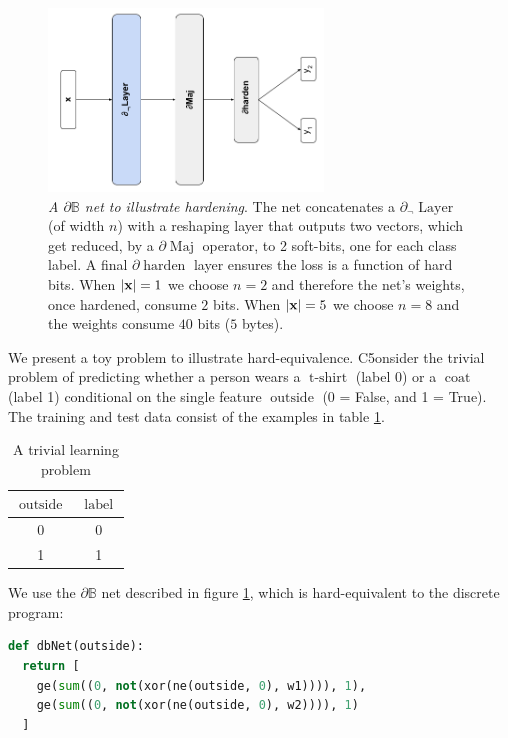 \documentclass{article} %
\begin{document}
\begin{figure}[t!]
	\centering
	\includegraphics[width=0.65\textwidth]{toy-example-architecture.png}
	\caption{{\em A $\partial\mathbb{B}$ net to illustrate hardening}. The net concatenates a $\partial_{\neg}\!\operatorname{Layer}$ (of width $n$) with a reshaping layer that  outputs two vectors, which get reduced, by a $\partial\!\operatorname{Maj}$ operator,  to 2 soft-bits, one for each class label. A final $\partial\!\operatorname{harden}$ layer ensures the loss is a function of hard bits. When $|{\bf x}|=1$ we choose $n=2$ and therefore the net's weights, once hardened, consume $2$ bits. When $|{\bf x}|=5$ we choose $n=8$ and the weights consume $40$ bits ($5$ bytes).}
	\label{fig:toy-example-architecture}
\end{figure}

We present a toy problem to illustrate hard-equivalence. C5onsider the trivial problem of predicting whether a person wears a $\operatorname{t-shirt}$ (label 0) or a $\operatorname{coat}$ (label 1) conditional on the single feature $\operatorname{outside}$ (0 = False, and 1 = True). The training and test data consist of the examples in table \ref{tab:toy1}.

\begin{table}[h!]
	\centering
	\begin{tabular}{|c|c|}
		$\operatorname{outside}$ & $\operatorname{label}$ \\ \hline
		0       & 0     \\
		1       & 1    
	\end{tabular}
	\caption{A trivial learning problem}
	\label{tab:toy1}
\end{table}

We use the $\partial\mathbb{B}$ net described in figure \ref{fig:toy-example-architecture}, which is hard-equivalent to the discrete program:

\begin{lstlisting}[language=Python,style=mystyle,frame=single]
def dbNet(outside):
  return [
    ge(sum((0, not(xor(ne(outside, 0), w1)))), 1),
	ge(sum((0, not(xor(ne(outside, 0), w2)))), 1)
  ]
\end{lstlisting}
\end{document}

